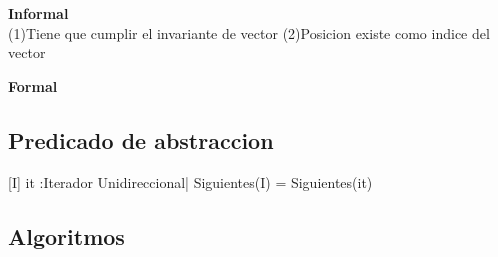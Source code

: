 \begin{Representacion}
\textbf{Informal}\\
(1)Tiene que cumplir el invariante de vector
(2)Posicion existe como indice del vector

\textbf{Formal}\\

\subsection{Predicado de abstraccion}

[I]{ it :Iterador Unidireccional| Siguientes(I) = Siguientes(it)}

\end{Representacion}
\subsection{Algoritmos}

